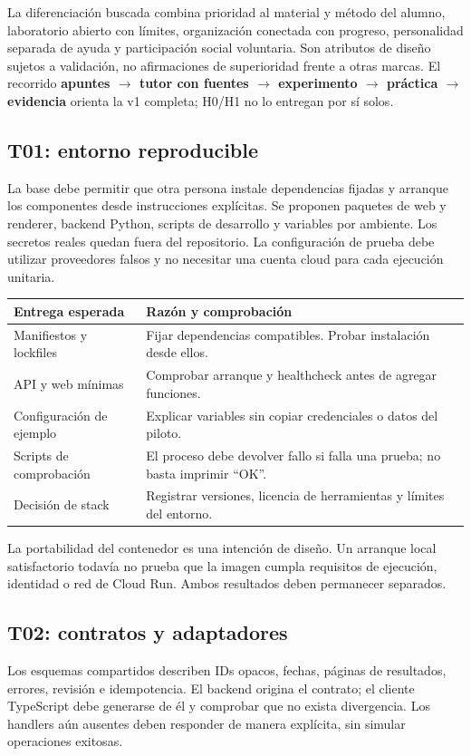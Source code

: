 La diferenciación buscada combina prioridad al material y método del alumno, laboratorio abierto con límites, organización conectada con progreso, personalidad separada de ayuda y participación social voluntaria. Son atributos de diseño sujetos a validación, no afirmaciones de superioridad frente a otras marcas. El recorrido \textbf{apuntes $\rightarrow$ tutor con fuentes $\rightarrow$ experimento $\rightarrow$ práctica $\rightarrow$ evidencia} orienta la v1 completa; H0/H1 no lo entregan por sí solos.

\clearpage
\subsection{T01: entorno reproducible}
La base debe permitir que otra persona instale dependencias fijadas y arranque los componentes desde instrucciones explícitas. Se proponen paquetes de web y renderer, backend Python, scripts de desarrollo y variables por ambiente. Los secretos reales quedan fuera del repositorio. La configuración de prueba debe utilizar proveedores falsos y no necesitar una cuenta cloud para cada ejecución unitaria.

\begin{tabularx}{\linewidth}{P{3.4cm}Y}
\toprule
\textbf{Entrega esperada} & \textbf{Razón y comprobación}\\
\midrule
Manifiestos y lockfiles & Fijar dependencias compatibles. Probar instalación desde ellos.\\
API y web mínimas & Comprobar arranque y healthcheck antes de agregar funciones.\\
Configuración de ejemplo & Explicar variables sin copiar credenciales o datos del piloto.\\
Scripts de comprobación & El proceso debe devolver fallo si falla una prueba; no basta imprimir ``OK''.\\
Decisión de stack & Registrar versiones, licencia de herramientas y límites del entorno.\\
\bottomrule
\end{tabularx}

La portabilidad del contenedor es una intención de diseño. Un arranque local satisfactorio todavía no prueba que la imagen cumpla requisitos de ejecución, identidad o red de Cloud Run. Ambos resultados deben permanecer separados.

\subsection{T02: contratos y adaptadores}
Los esquemas compartidos describen IDs opacos, fechas, páginas de resultados, errores, revisión e idempotencia. El backend origina el contrato; el cliente TypeScript debe generarse de él y comprobar que no exista divergencia. Los handlers aún ausentes deben responder de manera explícita, sin simular operaciones exitosas.

